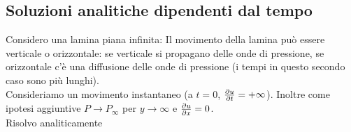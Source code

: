 \subsection{Soluzioni analitiche dipendenti dal tempo}
Considero una lamina piana infinita:
Il movimento della lamina può essere verticale o orizzontale: se verticale si propagano delle onde di pressione, se orizzontale c'è una diffusione delle onde di pressione (i tempi in questo secondo caso sono più lunghi).\\
Consideriamo un movimento instantaneo (a $ t = 0 $, $ \frac{\partial u}{\partial t} = + \infty$).
Inoltre come ipotesi aggiuntive $ P \to P_ \infty $ per $ y \to \infty $ e $ \frac{\partial u}{\partial x}=0 $.\\
Risolvo analiticamente
